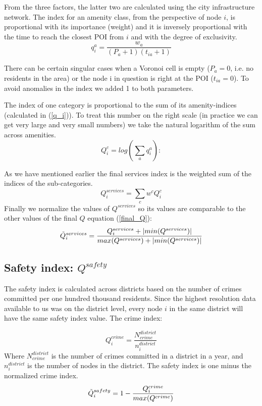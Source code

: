 From the three factors, the latter two are calculated using the city infrastructure network. The index for an amenity class, from the perspective of node $i$, is proportional with its importance (weight) and it is inversely proportional with the time to reach the closest POI from $i$ and with the degree of exclusivity.
\begin{equation}\label{q_i}
	q_i^a=\frac{w_{a}}{(P_a+1)(t_{ia}+1)}
\end{equation}

There can be certain singular cases when a Voronoi cell is empty ($P_a=0$, i.e. no residents in the area) or the node i in question is right at the POI ($t_{ia}=0$). To avoid anomalies in the index we added 1 to both parameters.

The index of one category is proportional to the sum of its amenity-indices (calculated in (\ref{q_i})). To treat this number on the right scale (in practice we can get very large and very small numbers) we take the natural logarithm of the sum across amenities.
\begin{equation}
	Q_i^c=log(\sum_a q_i^a):
\end{equation}

As we have mentioned earlier the final services index is the weighted sum of the indices of the sub-categories.
$$Q_i^{services} =\sum_c w^cQ_i^c $$
Finally we normalize the values of $Q^{services}$ so its values are comparable to the other values of the final $Q$ equation (\ref{final_Q}):
\begin{equation}
	\Tilde{Q}_i^{services} =\frac{Q_i^{services}+|min(Q^{services})|}{max(Q^{services})+|min(Q^{services})|}
\end{equation}

\subsection{Safety index: $Q^{safety}$} \label{safety}

The safety index is calculated across districts based on the number of crimes committed per one hundred thousand residents. Since the highest resolution data available to us was on the district level, every node $i$ in the same district will have the same safety index value. The crime index:

$$Q_i^{crime}=\frac{N^{district}_{crime}}{n_i^{district}}$$
Where $N^{district}_{crime}$ is the number of crimes committed in a district in a year, and $n_i^{district}$ is the number of nodes in the district. The safety index is one minus the normalized crime index.
\begin{equation}
	\Tilde{Q}_i^{safety}=1-\frac{Q_i^{crime}}{max(Q^{crime})}
\end{equation}

